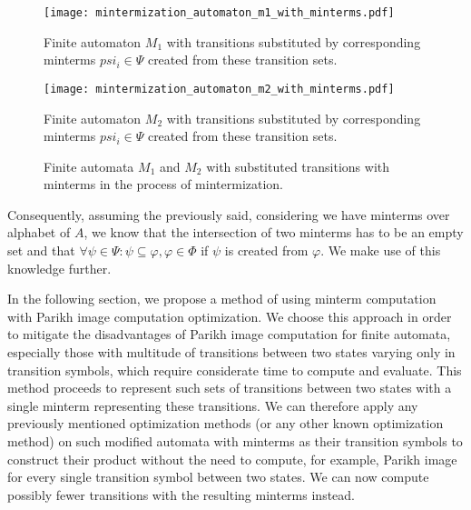 \begin{figure*}[ht]
    \centering
    \begin{minipage}{0.49\linewidth}
        \centering
        \texttt{[image: mintermization\_automaton\_m1\_with\_minterms.pdf]}
        \caption{Finite automaton $M_1$ with transitions substituted by corresponding minterms $psi_i \in \Psi$ created from these transition sets.}
        \label{fig:diagram:mintermization_automaton_m1_with_minterms}
    \end{minipage}
    \hfill
    \begin{minipage}{0.49\linewidth}
        \centering
        \texttt{[image: mintermization\_automaton\_m2\_with\_minterms.pdf]}
        \caption{Finite automaton $M_2$ with transitions substituted by corresponding minterms $psi_i \in \Psi$ created from these transition sets.}
        \label{fig:diagram:mintermization_automaton_m2_with_minterms}
    \end{minipage}
    \vspace{0.5cm}
    \caption{Finite automata $M_1$ and $M_2$ with substituted transitions with minterms in the process of mintermization.}
    \label{fig:diagram:mintermization_automata_with_minterms}
\end{figure*}

Consequently, assuming the previously said, considering we have minterms over alphabet of $A$, we know that the intersection of two minterms has to be an empty set and that $\forall \psi \in \Psi: \psi \subseteq \varphi, \varphi \in \Phi$ if $\psi$ is created from $\varphi$. We make use of this knowledge further.

In the following section, we propose a method of using minterm computation with Parikh image computation optimization. We choose this approach in order to mitigate the disadvantages of Parikh image computation for finite automata, especially those with multitude of transitions between two states varying only in transition symbols, which require considerate time to compute and evaluate. This method proceeds to represent such sets of transitions between two states with a single minterm representing these transitions. We can therefore apply any previously mentioned optimization methods (or any other known optimization method) on such modified automata with minterms as their transition symbols to construct their product without the need to compute, for example, Parikh image for every single transition symbol between two states. We can now compute possibly fewer transitions with the resulting minterms instead.

